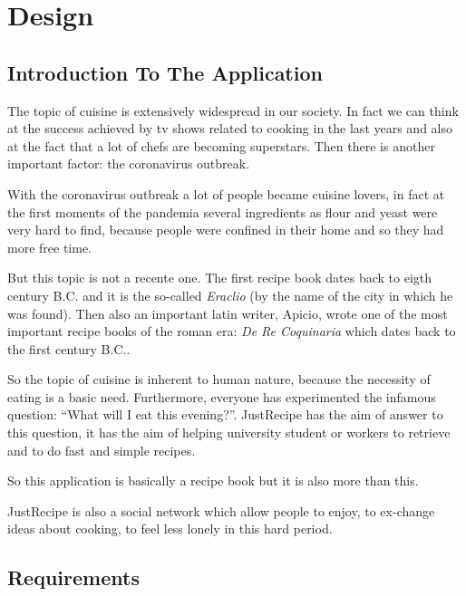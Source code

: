 \documentclass[a4paper]{report}
\begin{document}
\chapter{Design}
\section{Introduction To The Application}
The topic of cuisine is extensively widespread in our society. In fact we can think at the success achieved by tv shows related to cooking in the last years and also at the fact that a lot of chefs are becoming superstars.
Then there is another important factor: the coronavirus outbreak.

\noindent With the coronavirus outbreak a lot of people became cuisine lovers, in fact at the first moments of the pandemia several ingredients as flour and yeast were very hard to find, because people were confined in their home and so they had more free time.

\noindent But this topic is not a recente one. The first recipe book dates back to eigth century B.C. and it is the so-called \emph{Eraclio} (by the name of the city in which he was found). Then also an important latin writer, Apicio, wrote one of the most important recipe books of the roman era: \emph{De Re Coquinaria} which dates back to the first century B.C..
 
\noindent So the topic of cuisine is inherent to human nature, because the necessity of eating is a basic need.
Furthermore, everyone has experimented the infamous question: “What will I eat this evening?”. JustRecipe has the aim of answer to this question, it has the aim of helping university student or workers to retrieve and to do fast and simple recipes.

\noindent So this application is basically a recipe book but it is also more than this.

\noindent JustRecipe is also a social network which allow people to enjoy, to ex-change ideas about cooking, to feel less lonely in this hard period.

\section{Requirements}
\end{document}
